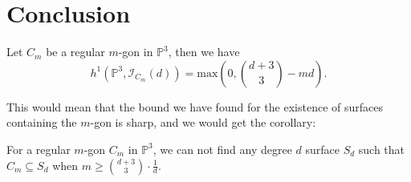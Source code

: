 \chapter{Conclusion}
\label{conc}


\begin{conjecture}
    Let $C_m$ be a regular $m$-gon in $\mathbb{P}^3$, then we have 
    \[
        h^1(\mathbb{P}^3, \mathcal{I}_{C_m}(d)) = \mathrm{max}\left(0, \binom{d+3}{3} - md\right).
    \]
\end{conjecture}
This would mean that the bound we have found for the existence of surfaces containing the $m$-gon is sharp, and we would get the corollary:
\begin{corollary}
    For a regular $m$-gon $C_m$ in $\mathbb{P}^3$, we can not find any degree $d$ surface $S_d$ such that $C_m \subseteq S_d$ when $m \geq \binom{d+3}{3}\cdot \frac{1}{d}$.
\end{corollary}



